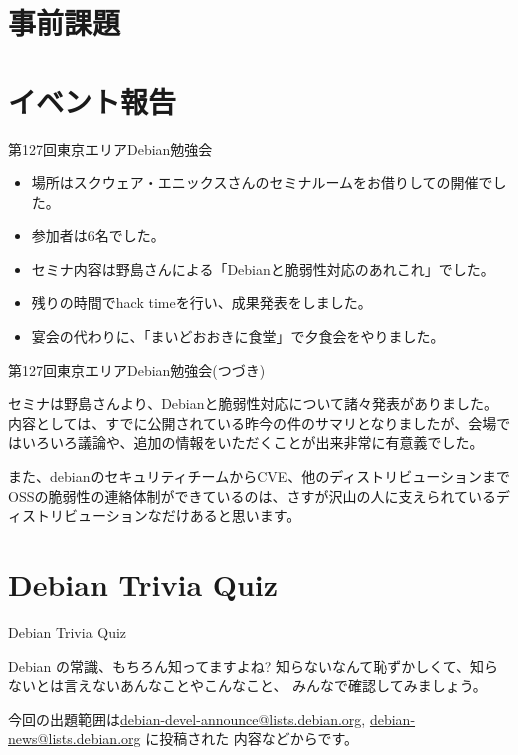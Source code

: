 \section{事前課題}
{\footnotesize

}

\section{イベント報告}

\begin{frame}{第127回東京エリアDebian勉強会}

\begin{itemize}
\item 場所はスクウェア・エニックスさんのセミナルームをお借りしての開催でした。
\item 参加者は6名でした。
\item セミナ内容は野島さんによる「Debianと脆弱性対応のあれこれ」でした。
\item 残りの時間でhack timeを行い、成果発表をしました。
\item 宴会の代わりに、「まいどおおきに食堂」で夕食会をやりました。
\end{itemize} 
  
\end{frame}

\begin{frame}{第127回東京エリアDebian勉強会(つづき)}

 セミナは野島さんより、Debianと脆弱性対応について諸々発表がありました。内容としては、すでに公開されている昨今の件のサマリとなりましたが、会場ではいろいろ議論や、追加の情報をいただくことが出来非常に有意義でした。

 また、debianのセキュリティチームからCVE、他のディストリビューションまでOSSの脆弱性の連絡体制ができているのは、さすが沢山の人に支えられているディストリビューションなだけあると思います。
  
\end{frame}

  
\section{Debian Trivia Quiz}
\begin{frame}{Debian Trivia Quiz}

  Debian の常識、もちろん知ってますよね?
知らないなんて恥ずかしくて、知らないとは言えないあんなことやこんなこと、
みんなで確認してみましょう。

今回の出題範囲は\url{debian-devel-announce@lists.debian.org},
\url{debian-news@lists.debian.org} に投稿された
内容などからです。

\end{frame}

